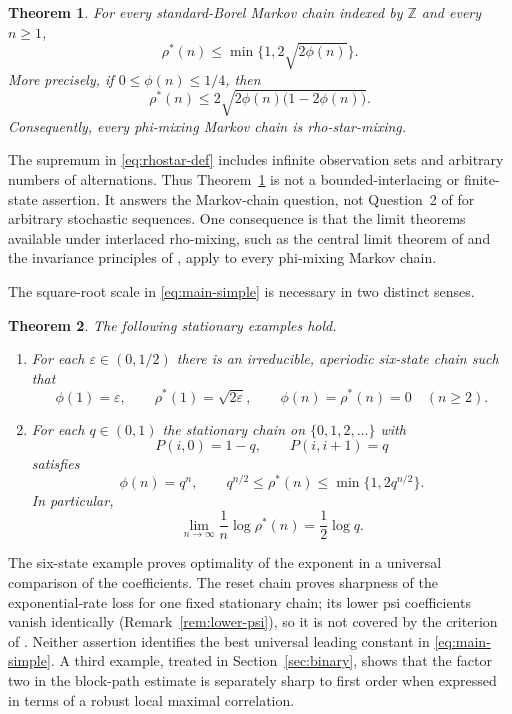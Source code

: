 \documentclass[11pt]{amsart}
\numberwithin{equation}{section}
\newtheorem{theorem}{Theorem}[section]
\theoremstyle{definition}
\newcommand{\ZZ}{\mathbb Z}
\newcommand{\rhostar}{\rho^{*}}
\begin{document}
\begin{theorem}\label{thm:main}
For every standard-Borel Markov chain indexed by $\ZZ$ and every $n\ge1$,
\begin{equation}\label{eq:main-simple}
\rhostar(n)\le\min\{1,2\sqrt{2\phi(n)}\}.
\end{equation}
More precisely, if $0\le\phi(n)\le1/4$, then
\begin{equation}\label{eq:main-strong}
\rhostar(n)\le2\sqrt{2\phi(n)\bigl(1-2\phi(n)\bigr)}.
\end{equation}
Consequently, every phi-mixing Markov chain is rho-star-mixing.
\end{theorem}

The supremum in \eqref{eq:rhostar-def} includes infinite observation sets and arbitrary numbers of alternations. Thus Theorem~\ref{thm:main} is not a bounded-interlacing or finite-state assertion. It answers the Markov-chain question, not Question~2 of \cite{Bradley2005} for arbitrary stochastic sequences. One consequence is that the limit theorems available under interlaced rho-mixing, such as the central limit theorem of \cite{Bradley1992} and the invariance principles of \cite{Peligrad1998,UtevPeligrad2003}, apply to every phi-mixing Markov chain.

The square-root scale in \eqref{eq:main-simple} is necessary in two distinct senses.

\begin{theorem}\label{thm:sharpness-summary}
The following stationary examples hold.
\begin{enumerate}
\item For each $\varepsilon\in(0,1/2)$ there is an irreducible, aperiodic six-state chain such that
\[
\phi(1)=\varepsilon,\qquad \rhostar(1)=\sqrt{2\varepsilon},
\qquad \phi(n)=\rhostar(n)=0\quad(n\ge2).
\]
\item For each $q\in(0,1)$ the stationary chain on $\{0,1,2,\ldots\}$ with
\[
P(i,0)=1-q,\qquad P(i,i+1)=q
\]
satisfies
\[
\phi(n)=q^n,\qquad q^{n/2}\le\rhostar(n)\le\min\{1,2q^{n/2}\}.
\]
In particular,
\[
\lim_{n\to\infty}\frac{1}{n}\log\rhostar(n)=\frac12\log q.
\]
\end{enumerate}
\end{theorem}

The six-state example proves optimality of the exponent in a universal comparison of the coefficients. The reset chain proves sharpness of the exponential-rate loss for one fixed stationary chain; its lower psi coefficients vanish identically (Remark~\ref{rem:lower-psi}), so it is not covered by the criterion of \cite{Bradley1997}. Neither assertion identifies the best universal leading constant in \eqref{eq:main-simple}. A third example, treated in Section~\ref{sec:binary}, shows that the factor two in the block-path estimate is separately sharp to first order when expressed in terms of a robust local maximal correlation.
\end{document}
